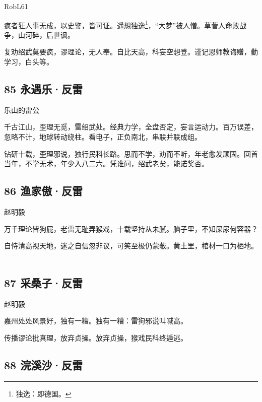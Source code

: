 {RobL61}

疯者狂人事无成，以史鉴，皆可证。遥想独逸\footnote{独逸：即德国。}，``大梦''被人憎。草菅人命败战争，山河碎，后世讽。

复劝绍武莫要疯，谬理论，无人奉。自比天高，科妄空想登。谨记恩师教诲赠，勤学习，白头等。
~\\

\hypertarget{ux6c38ux9047ux4e50ux53cdux96f7}{%
\subsection{85 永遇乐·反雷}\label{ux6c38ux9047ux4e50ux53cdux96f7}}

{乐山的雷公}

千古江山，歪理无觅，雷绍武处。经典力学，全盘否定，妄言运动力。百万误差，忽略不计，地球转动绕柱。看电子，正负南北，串联并联成组。

钻研十载，歪理邪说，独行民科长路。思而不学，劝而不听，年老愈发顽固。回首当年，不学无术，年少入八二六。凭谁问，绍武老矣，能诺奖否。

\hypertarget{ux6e14ux5bb6ux50b2ux53cdux96f7}{%
\subsection{86 渔家傲·反雷}\label{ux6e14ux5bb6ux50b2ux53cdux96f7}}

{赵明毅}

万千理论皆狗屁，老雷无耻弄猴戏，十载坚持从未腻。脑子里，不知屎尿何容器？

自恃清高视天地，迷之自信忽非议，可笑至极仍蒙蔽。黄土里，棺材一口为栖地。
~\\

\hypertarget{ux91c7ux6851ux5b50ux53cdux96f7}{%
\subsection{87 采桑子·反雷}\label{ux91c7ux6851ux5b50ux53cdux96f7}}

{赵明毅}

嘉州处处风景好，独有一糟。独有一糟：雷狗邪说叫喊高。

传播谬论批真理，放弃贞操。放弃贞操，猴戏民科终遁逃。 ~\\

\hypertarget{ux6d63ux6eaaux6c99ux53cdux96f7}{%
\subsection{88 浣溪沙·反雷}\label{ux6d63ux6eaaux6c99ux53cdux96f7}}

